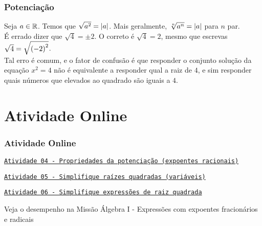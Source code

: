 \documentclass[brazil, notheorems, 10pt]{beamer}
\begin{document}
\begin{frame}
\frametitle{Potenciação} %
\begin{Obse}
Seja $a \in \mathbb{R}$. Temos que $\sqrt{a^2} = \left|a\right|$. Mais geralmente,
$\sqrt[n] {a^n} = \left|a\right|$ para $n$ par. \\
É errado dizer que $\sqrt 4 = \pm 2$. O correto é $\sqrt 4 = 2$,
mesmo que escrevas $\sqrt 4 = \sqrt{\left(-2\right)^2}$. \\
Tal erro é comum, e o fator de confusão é que responder o conjunto
solução da equação $x^2=4$ não é equivalente a responder qual a raiz
de $4$, e sim responder quais números que elevados ao quadrado são
iguais a $4$.
\end{Obse}
\end{frame}





\section{Atividade Online}
\begin{frame}
\frametitle{Atividade Online} %

\href{https://pt.khanacademy.org/math/algebra/rational-exponents-and-radicals/rational-exponents-and-the-properties-of-exponents/e/exponents_4}
{{\tt Atividade 04 - Propriedades da potenciação (expoentes
racionais)}}

\href{https://pt.khanacademy.org/math/algebra/rational-exponents-and-radicals/alg1-simplify-square-roots/e/multiplying_radicals}
{{\tt Atividade 05 - Simplifique raízes quadradas (variáveis)}}

\href{https://pt.khanacademy.org/math/algebra/rational-exponents-and-radicals/alg1-simplify-square-roots/e/adding_and_subtracting_radicals}
{{\tt Atividade 06 - Simplifique expressões de raiz quadrada}}



Veja o desempenho na Missão Álgebra I - Expressões com expoentes
fracionários e radicais

\end{frame}

\end{document}
